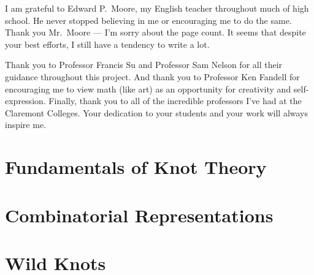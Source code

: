 \documentclass[math]{hmcthesis}
\begin{document}

\begin{acknowledgments}
  I am grateful to Edward P.\ Moore, my English teacher throughout
  much of high school. He never stopped believing in me or encouraging
  me to do the same. Thank you Mr.\ Moore --- I'm sorry about the page
  count. It seems that despite your best efforts, I still have a
  tendency to write a lot.

  Thank you to Professor Francis Su and Professor Sam Nelson for all
  their guidance throughout this project. And thank you to Professor
  Ken Fandell for encouraging me to view math (like art) as an
  opportunity for creativity and self-expression. Finally, thank you
  to all of the incredible professors I've had at the Claremont
  Colleges. Your dedication to your students and your work will always
  inspire me.
\end{acknowledgments}


\renewcommand{\textflush}{flushright}
\renewcommand{\epigraphflush}{flushright}




\mainmatter




\part{Fundamentals of Knot Theory}\label{part:fundamentals}




\part{Combinatorial
  Representations}\label{part:unknotting-moves-and-combinatorial-representations}
\def\figdir{figures/unknotting-moves-and-combinatorial-representations}









\part{Wild Knots}\label{part:wild-knots}
\def\figdir{figures/wild}
\end{document}
